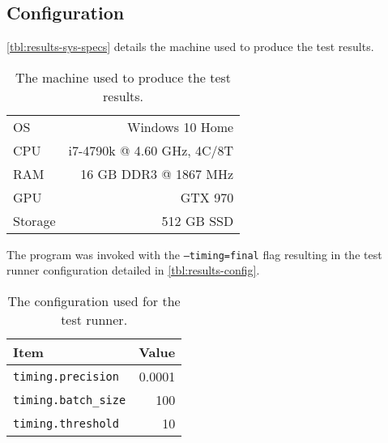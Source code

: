 \subsection{Configuration}

\autoref{tbl:results-sys-specs} details the machine used to produce the test results.

\begin{table}[H] 
    \centering
    \begin{tabular}{l|r}
        \toprule

        OS & Windows 10 Home \\
        CPU & i7-4790k @ 4.60 GHz, 4C/8T \\
        RAM & 16 GB DDR3 @ 1867 MHz \\
        GPU & GTX 970 \\
        Storage & 512 GB SSD \\

        \bottomrule
    \end{tabular}
    \caption{The machine used to produce the test results.}
    \label{tbl:results-sys-specs}
\end{table}

The program was invoked with the \texttt{--timing=final} flag resulting in the test runner configuration detailed in \autoref{tbl:results-config}.

\begin{table}[H] 
    \centering
    \begin{tabular}{l|r}
        \toprule
        Item & Value \\
        \midrule

        \texttt{timing.precision} & 0.0001 \\
        \texttt{timing.batch\_size} & 100 \\
        \texttt{timing.threshold} & 10 \\

        \bottomrule
    \end{tabular}
    \caption{The configuration used for the test runner.}
    \label{tbl:results-config}
\end{table}

